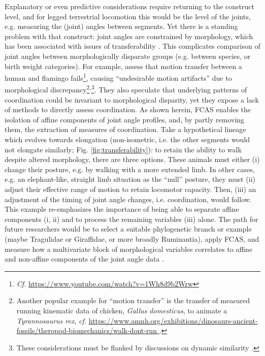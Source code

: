Explanatory or even predictive considerations require returning to the construct level, and for legged terrestrial locomotion this would be the level of the joints, e.g. measuring the (joint) angles between segments.
Yet there is a standing problem with that construct: joint angles are constrained by morphology, which has been associated with issues of transferability \citep{Gatesy2011}.
This complicates comparison of joint angles between morphologically disparate groups (e.g. between species, or birth weight categories).
For example, \citet{Gatesy2011} assess that motion transfer between a human and flamingo fails\footnote{\textit{Cf.} \url{https://www.youtube.com/watch?v=1Wh8d9b2Wrw}}, causing ``undesirable motion artifacts'' due to morphological discrepancy\footnote{Another popular example for ``motion transfer'' is the transfer of measured running kinematic data of chicken, \textit{Gallus domesticus}, to animate a \textit{Tyrannosaurus rex}, \textit{cf.} \url{https://www.amnh.org/exhibitions/dinosaurs-ancient-fossils/theropod-biomechanics/walk-dont-run }.}\(^,\)\footnote{These considerations must be flanked by discussions on dynamic similarity \citep{Aerts2023}.}.
They also speculate that underlying patterns of coordination could be invariant to morphological disparity, yet they expose a lack of methods to directly assess coordination.
As shown herein, FCAS enables the isolation of affine components of joint angle profiles, and, by partly removing them, the extraction of measures of coordination.
Take a hypothetical lineage which evolves towards elongation  (non-isometric, i.e. the other segments would not elongate similarly; Fig. \ref{fig:transferability}): to retain the ability to walk despite altered morphology, there are three options.
These animals must either (i) change their posture, e.g. by walking with a more extended limb.
In other cases, e.g. an elephant-like, straight limb situation as the ``null'' posture, they must (ii) adjust their effective range of motion to retain locomotor capacity.
Then, (iii) an adjustment of the timing of joint angle changes, i.e. coordination, would follow.
This example re-emphasizes the importance of being able to separate affine components (i, ii) and to process the remaining variables (iii) alone.
The path for future researchers would be to select a suitable phylogenetic branch or example (maybe Tragulidae or Giraffidae, or more broadly Ruminantia), apply FCAS, and measure how a multivariate block of morphological variables correlates to affine and non-affine components of the joint angle data \citep[a suitable method might be Two-Block Partial Least Squares,][]{Rohlf2000}.
